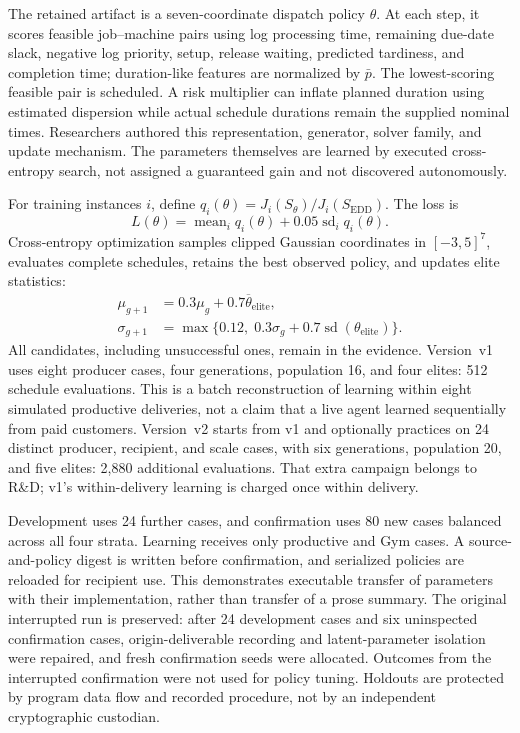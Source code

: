 The retained artifact is a seven-coordinate dispatch policy $\theta$. At each step, it scores feasible job--machine pairs using log processing time, remaining due-date slack, negative log priority, setup, release waiting, predicted tardiness, and completion time; duration-like features are normalized by $\bar p$. The lowest-scoring feasible pair is scheduled. A risk multiplier can inflate planned duration using estimated dispersion while actual schedule durations remain the supplied nominal times. Researchers authored this representation, generator, solver family, and update mechanism. The parameters themselves are learned by executed cross-entropy search, not assigned a guaranteed gain and not discovered autonomously.

For training instances $i$, define $q_i(\theta)=J_i(S_\theta)/J_i(S_{\mathrm{EDD}})$. The loss is
\begin{equation}
 L(\theta)=\operatorname{mean}_i q_i(\theta)
             +0.05\operatorname{sd}_i q_i(\theta).
\end{equation}
Cross-entropy optimization \cite{rubinstein1999crossentropy} samples clipped Gaussian coordinates in $[-3,5]^7$, evaluates complete schedules, retains the best observed policy, and updates elite statistics:
\begin{align}
 \mu_{g+1}&=0.3\mu_g+0.7\overline{\theta}_{\mathrm{elite}},\\
 \sigma_{g+1}&=\max\{0.12,\;0.3\sigma_g+0.7\operatorname{sd}(\theta_{\mathrm{elite}})\}.
\end{align}
All candidates, including unsuccessful ones, remain in the evidence. Version~v1 uses eight producer cases, four generations, population 16, and four elites: 512 schedule evaluations. This is a batch reconstruction of learning within eight simulated productive deliveries, not a claim that a live agent learned sequentially from paid customers. Version~v2 starts from v1 and optionally practices on 24 distinct producer, recipient, and scale cases, with six generations, population 20, and five elites: 2,880 additional evaluations. That extra campaign belongs to R\&D; v1's within-delivery learning is charged once within delivery.

Development uses 24 further cases, and confirmation uses 80 new cases balanced across all four strata. Learning receives only productive and Gym cases. A source-and-policy digest is written before confirmation, and serialized policies are reloaded for recipient use. This demonstrates executable transfer of parameters with their implementation, rather than transfer of a prose summary. The original interrupted run is preserved: after 24 development cases and six uninspected confirmation cases, origin-deliverable recording and latent-parameter isolation were repaired, and fresh confirmation seeds were allocated. Outcomes from the interrupted confirmation were not used for policy tuning. Holdouts are protected by program data flow and recorded procedure, not by an independent cryptographic custodian.

